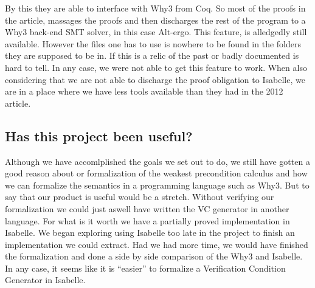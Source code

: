 By this they are able to interface with Why3 from Coq.
So most of the proofs in the article, massages the proofs and then discharges the rest of the program to a Why3 back-end SMT solver, in this case Alt-ergo.
This feature, is alledgedly still available\cite{TODO:LIERS}. However the files one has to use is nowhere to be found in the folders they are supposed to be in.
If this is a relic of the past or badly documented is hard to tell. In any case, we were not able to get this feature to work.
When also considering that we are not able to discharge the proof obligation to Isabelle, we are in a place where we have less tools available than they had in the 2012 article.

\subsection{Has this project been useful?}
Although we have accomlplished the goals we set out to do, we still have gotten a good reason about or formalization of the weakest precondition calculus and how we can formalize the semantics in a programming language such as Why3.
But to say that our product is useful would be a stretch. Without verifying our formalization we could just aswell have written the VC generator in another language.
For what is it worth we have a partially proved implementation in Isabelle.
We began exploring using Isabelle too late in the project to finish an implementation we could extract.
Had we had more time, we would have finished the formalization and done a side by side comparison of the Why3 and Isabelle.
In any case, it seems like it is ``easier'' to formalize a Verification Condition Generator in Isabelle.
